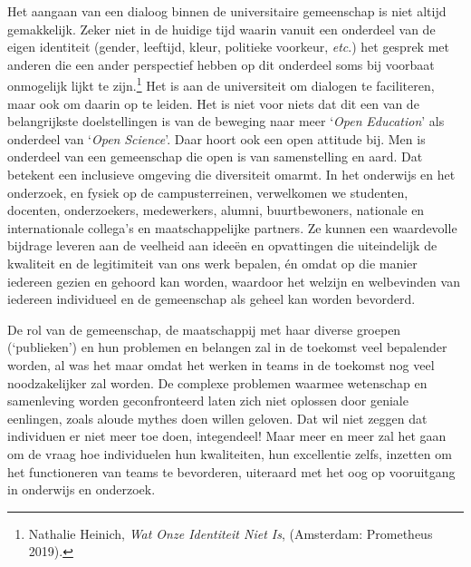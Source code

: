 \documentclass[smallauthor, chapterhaspagenum, nochapterinheader, pagenuminheader,  bigchapnum,medium2, tocpages,  garamond, titleinheader]{jote-book}
\begin{document}
	Het aangaan van een dialoog binnen de universitaire gemeenschap is niet altijd gemakkelijk. Zeker niet in de huidige tijd waarin vanuit een onderdeel van de eigen identiteit (gender, leeftijd, kleur, politieke voorkeur, \emph{etc}.) het gesprek met anderen die een ander perspectief hebben op dit onderdeel soms bij voorbaat onmogelijk lijkt te zijn.\footnote{Nathalie Heinich, \emph{Wat Onze Identiteit Niet Is}, (Amsterdam: Prometheus 2019).} Het is aan de universiteit om dialogen te faciliteren, maar ook om daarin op te leiden. Het is niet voor niets dat dit een van de belangrijkste doelstellingen is van de beweging naar meer ‘\emph{Open }\emph{Education}' als onderdeel van ‘\emph{Open }\emph{Science}'. Daar hoort ook een open attitude bij. Men is onderdeel van een gemeenschap die open is van samenstelling en aard. Dat betekent een inclusieve omgeving die diversiteit omarmt. In het onderwijs en het onderzoek, en fysiek op de campusterreinen, verwelkomen we studenten, docenten, onderzoekers, medewerkers, alumni, buurtbewoners, nationale en internationale collega's en maatschappelijke partners. Ze kunnen een waardevolle bijdrage leveren aan de veelheid aan ideeën en opvattingen die uiteindelijk de kwaliteit en de legitimiteit van ons werk bepalen, én omdat op die manier iedereen gezien en gehoord kan worden, waardoor het welzijn en welbevinden van iedereen individueel en de gemeenschap als geheel kan worden bevorderd.



	De rol van de gemeenschap, de maatschappij met haar diverse groepen (‘publieken') en hun problemen en belangen zal in de toekomst veel bepalender worden, al was het maar omdat het werken in teams in de toekomst nog veel noodzakelijker zal worden. De complexe problemen waarmee wetenschap en samenleving worden geconfronteerd laten zich niet oplossen door geniale eenlingen, zoals aloude mythes doen willen geloven. Dat wil niet zeggen dat individuen er niet meer toe doen, integendeel! Maar meer en meer zal het gaan om de vraag hoe individuelen hun kwaliteiten, hun excellentie zelfs, inzetten om het functioneren van teams te bevorderen, uiteraard met het oog op vooruitgang in onderwijs en onderzoek.
\end{document}
